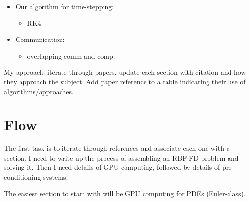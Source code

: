 \documentclass[11pt]{report}
\begin{document}
\begin{itemize}
\item Our algorithm for time-stepping: 
\begin{itemize} 
\item RK4
\end{itemize}


\item Communication: 
\begin{itemize} 
\item overlapping comm and comp. 
\end{itemize}

\end{itemize} 


My approach: 
iterate through papers. update each section with citation and how they approach the subject. Add paper reference to a table indicating their use of algorithms/approaches.


\section{Flow} 
The first task is to iterate through references and associate each one with a section. I need to write-up the process of assembling an RBF-FD problem and solving it. Then I need details of GPU computing, followed by details of pre-conditioning systems.   

The easiest section to start with will be GPU computing for PDEs (Euler-class).
\end{document}
